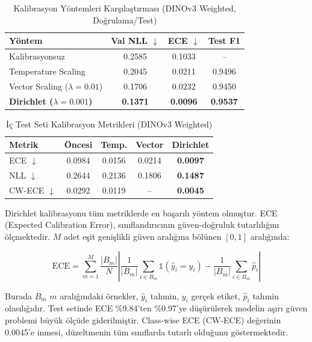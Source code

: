 \documentclass[conference]{IEEEtran}
\begin{document}
\begin{table}[h]
\centering
\caption{Kalibrasyon Yöntemleri Karşılaştırması (DINOv3 Weighted, Doğrulama/Test)}
\label{tab:calibration}
\begin{tabular}{@{}lccc@{}}
\toprule
\textbf{Yöntem} & \textbf{Val NLL $\downarrow$} & \textbf{ECE $\downarrow$} & \textbf{Test F1} \\ \midrule
Kalibrasyonsuz & 0.2585 & 0.1033 & -- \\
Temperature Scaling & 0.2045 & 0.0211 & 0.9496 \\
Vector Scaling ($\lambda=0.01$) & 0.1706 & 0.0232 & 0.9450 \\
\textbf{Dirichlet ($\lambda=0.001$)} & \textbf{0.1371} & \textbf{0.0096} & \textbf{0.9537} \\ \bottomrule
\end{tabular}
\end{table}

\begin{table}[h]
\centering
\caption{İç Test Seti Kalibrasyon Metrikleri (DINOv3 Weighted)}
\label{tab:calibration_detail}
\begin{tabular}{@{}lcccc@{}}
\toprule
\textbf{Metrik} & \textbf{Öncesi} & \textbf{Temp.} & \textbf{Vector} & \textbf{Dirichlet} \\ \midrule
ECE $\downarrow$ & 0.0984 & 0.0156 & 0.0214 & \textbf{0.0097} \\
NLL $\downarrow$ & 0.2644 & 0.2136 & 0.1806 & \textbf{0.1487} \\
CW-ECE $\downarrow$ & 0.0292 & 0.0119 & -- & \textbf{0.0045} \\ \bottomrule
\end{tabular}
\end{table}

Dirichlet kalibrasyonu tüm metriklerde en başarılı yöntem olmuştur. ECE (Expected Calibration Error), sınıflandırıcının güven-doğruluk tutarlılığını ölçmektedir. $M$ adet eşit genişlikli güven aralığına bölünen $[0,1]$ aralığında:

\begin{equation}
\text{ECE} = \sum_{m=1}^{M} \frac{|B_m|}{N} \left| \frac{1}{|B_m|} \sum_{i \in B_m} \mathbb{1}(\hat{y}_i = y_i) - \frac{1}{|B_m|} \sum_{i \in B_m} \hat{p}_i \right|
\label{eq:ece}
\end{equation}

Burada $B_m$ $m$ aralığındaki örnekler, $\hat{y}_i$ tahmin, $y_i$ gerçek etiket, $\hat{p}_i$ tahmin olasılığıdır. Test setinde ECE \%9.84'ten \%0.97'ye düşürülerek modelin aşırı güven problemi büyük ölçüde giderilmiştir. Class-wise ECE (CW-ECE) değerinin 0.0045'e inmesi, düzeltmenin tüm sınıflarda tutarlı olduğunu göstermektedir.
\end{document}
